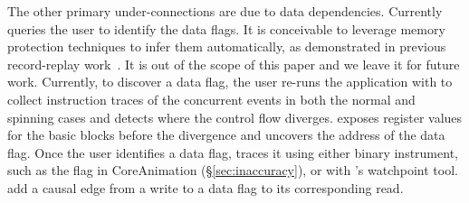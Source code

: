 The other primary under-connections are due to data dependencies. Currently \xxx
queries the user to identify the data flags. It is conceivable to leverage
memory protection techniques to infer them automatically, as demonstrated in
previous record-replay work~\cite{king2005debugging, dunlap2008execution}. It
is out of the scope of this paper and we leave it for future work. Currently,
to discover a data flag, the user re-runs the application with \xxx to collect
instruction traces of the concurrent events in both the normal and spinning
cases and detects where the control flow diverges. \xxx exposes register
values for the basic blocks before the divergence and uncovers the address
of the data flag. Once the user identifies a data flag, \xxx traces it using
either binary instrument, such as the  flag in CoreAnimation
(\S\ref{sec:inaccuracy}), or with \xxx's watchpoint tool. \xxx add a causal edge
from a write to a data flag to its corresponding read.
